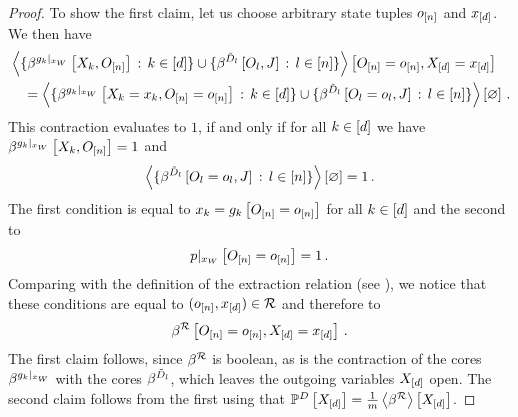 \begin{proof}
    To show the first claim, let us choose arbitrary state tuples $o_{[n]}$ and $x_{[d]}$.
    We then have
    \begin{align*}
        &\left\langle 
            \{\beta^{{g_{k}}|_{x_{W}}}\left[X_{k},O_{[n]}\right] \, : \, k\in[d]\}
            \cup \{\beta^{\tilde{D}_{l}}\left[O_{l},J\right] \, : \, l\in[n]\}
        \right\rangle \left[ O_{[n]}=o_{[n]},X_{[d]}=x_{[d]} \right] \\
        & \quad  =  \left\langle 
            \{\beta^{{g_{k}}|_{x_{W}}}\left[X_{k}=x_{k},O_{[n]}=o_{[n]}\right] \, : \, k\in[d]\}
            \cup \{\beta^{\tilde{D}_{l}}\left[O_{l}=o_{l},J\right] \, : \, l\in[n]\}
        \right\rangle \left[ \varnothing \right] \, .
    \end{align*}
    This contraction evaluates to $1$, if and only if for all $k\in[d]$ we have $\beta^{{g_{k}}|_{x_{W}}}\left[X_{k},O_{[n]}\right]=1$ and
    \begin{align*}
        \left\langle \{\beta^{\tilde{D}_{l}}\left[O_{l}=o_{l},J\right] \, : \, l\in[n]\}\right\rangle \left[ \varnothing \right]  = 1 \, .
    \end{align*}
    The first condition is equal to $x_{k} = g_{k}\left[O_{[n]}=o_{[n]}\right]$ for all $k\in[d]$ and the second to
    \begin{align*}
        {p}|_{x_{W}} \left[O_{[n]}=o_{[n]}\right] = 1 \, .
    \end{align*}
    Comparing with the definition of the extraction relation (see ), we notice that these conditions are equal to $(o_{[n]},x_{[d]})\in\mathcal{R}$ and therefore to
    \begin{align*}
        \beta^{\mathcal{R}}\left[O_{[n]}=o_{[n]},X_{[d]}=x_{[d]}\right] \, .
    \end{align*}
    The first claim follows, since $\beta^{\mathcal{R}}$ is boolean, as is the contraction of the cores $\beta^{{g_{k}}|_{x_{W}}}$ with the cores $\beta^{\tilde{D}_{l}}$, which leaves the outgoing variables $X_{[d]}$ open.
    The second claim follows from the first using that $\mathbb{P}^{D}\left[X_{[d]}\right]=\frac{1}{m}\left\langle \beta^{\mathcal{R}}\right\rangle \left[ X_{[d]} \right]$.
\end{proof}

